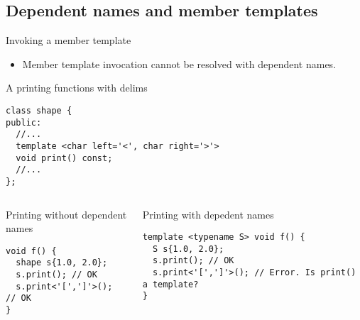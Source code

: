\subsection{Dependent names and member templates}

\begin{frame}[t,fragile]{Invoking a member template}
\begin{itemize}
  \item Member template invocation cannot be resolved with dependent names.
\end{itemize}

\begin{block}{A printing functions with delims}
\begin{lstlisting}[basicstyle=\tiny]
class shape {
public:
  //...
  template <char left='<', char right='>'>
  void print() const;
  //...
};
\end{lstlisting}
\end{block}

\begin{columns}[T]

\begin{block}{Printing without dependent names}
\begin{lstlisting}
void f() {
  shape s{1.0, 2.0};
  s.print(); // OK
  s.print<'[',']'>(); // OK
}
\end{lstlisting}
\end{block}

\begin{block}{Printing with depedent names}
\begin{lstlisting}
template <typename S> void f() {
  S s{1.0, 2.0};
  s.print(); // OK
  s.print<'[',']'>(); // Error. Is print() a template?
}
\end{lstlisting}
\end{block}

\end{columns}
\end{frame}

